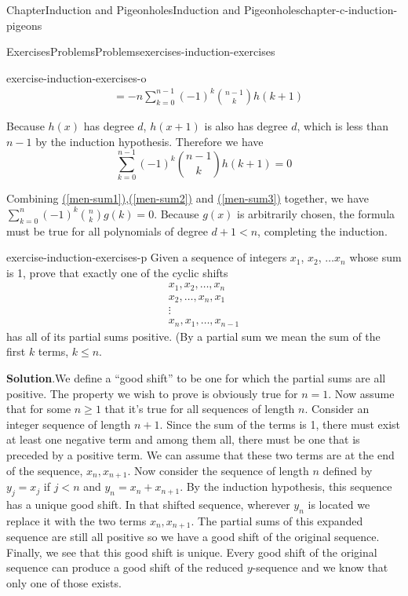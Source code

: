 \documentclass[oneside,10pt,]{book}
\newcommand{\blocktitlefont}{\relax}
\newcommand{\xreffont}{\relax}
\numberwithin{equation}{section}
\newcommand{\lt}{<}
\begin{document}
\begin{chapterptx}{Chapter}{Induction and Pigeonholes}{}{Induction and Pigeonholes}{}{}{chapter-c-induction-pigeons}
\begin{exercises-section}{Exercises}{Problems}{}{Problems}{}{}{exercises-induction-exercises}
\begin{divisionexercise}{14}{}{}{exercise-induction-exercises-o}
\begin{equation}
\begin{split}
& = -n\sum_{k=0}^{n-1} (-1)^k\binom{n-1}{k}h(k+1)
\end{split}\label{men-sum2}
\end{equation}
%
\par
Because \(h(x)\) has degree \(d\), \(h(x+1)\) is also has degree \(d\), which is less than \(n - 1\) by the induction hypothesis. Therefore we have%
\begin{equation}
\sum_{k=0}^{n-1} (-1)^k\binom{n-1}{k}h(k+1)  = 0 \label{men-sum3}
\end{equation}
%
\par
Combining \hyperref[men-sum1]{({\xreffont\ref{men-sum1}})},\hyperref[men-sum2]{({\xreffont\ref{men-sum2}})} and \hyperref[men-sum3]{({\xreffont\ref{men-sum3}})} together, we have \(\sum_{k=0}^{n} (-1)^k\binom{n}{k}g(k) = 0\). Because \(g(x)\) is arbitrarily chosen, the formula must be true for all polynomials of degree \(d + 1 \lt n\), completing the induction.%
\end{divisionexercise}%
\begin{divisionexercise}{15}{}{}{exercise-induction-exercises-p}%
Given a sequence of integers \(x_1\), \(x_2\), \(\dots x_n\) whose sum is 1, prove that exactly one of the cyclic shifts%
\begin{gather*}
x_1,x_2,\dots ,x_n \\
x_2,\dots,x_n,x_1  \\
\vdots    \\
x_n,x_1,\dots,x_{n-1}  
\end{gather*}
has all of its partial sums positive. (By a partial sum we mean the sum of the first \(k\) terms, \(k \leq  n\).%
\par\smallskip%
\noindent\textbf{\blocktitlefont Solution}.\hypertarget{solution-induction-exercises-p-b}{}\quad{}We define a ``good shift'' to be one for which the partial sums are all positive. The property we wish to prove is obviously true for \(n=1\).  Now assume that for some \(n \geq 1\) that it's true for all sequences of length \(n\).  Consider an integer sequence of length \(n+1\).  Since the sum of the terms is 1, there must exist at least one negative term and among them all, there must be one that is preceded by a positive term. We can assume that these two terms are at the end of the sequence, \(x_n, x_{n+1}\).  Now consider the sequence of length \(n\) defined by \(y_j = x_j\) if \(j \lt n\)  and  \(y_n=x_n+x_{n+1}\).  By the induction hypothesis, this sequence has a unique good shift.  In that shifted sequence, wherever \(y_n\) is located  we replace it with the two terms \(x_n, x_{n+1}\). The partial sums of this expanded sequence are still all positive so we have a good shift of the original sequence.  Finally, we see that this good shift is unique. Every good shift of the original sequence can produce a good shift of the reduced \(y\)-sequence and we know that only one of those exists.%

\end{divisionexercise}
\end{exercises-section}
\end{chapterptx}
\end{document}
